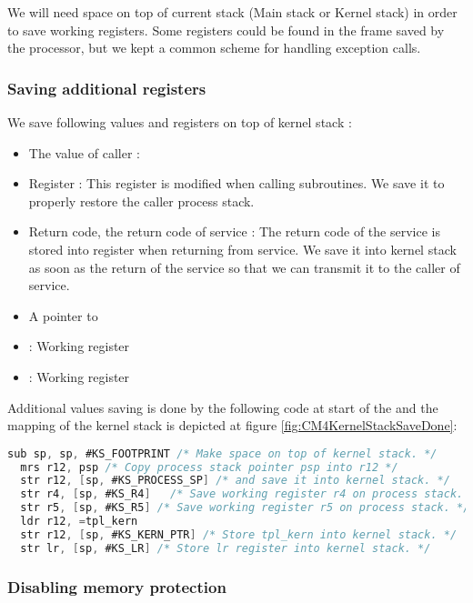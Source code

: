 We will need space on top of current stack (Main stack or Kernel stack)  in order to save working registers.
Some registers could be found in the frame saved by the processor, but we kept a common scheme for handling exception calls.

\subsubsection{Saving additional registers}

We save following values and registers on top of kernel stack :
\begin{itemize}
\item The value of caller  : 
\item Register  : This register is modified when calling subroutines. We save it to properly restore the caller process stack.
\item Return code, the return code of service : The return code of the service is stored into  register when returning from service. We save it into kernel stack as soon as the return of the service so that we can transmit it to the caller of service.
\item A pointer to 
\item {} : Working register
\item {} : Working register
\end{itemize}


Additional values saving is done by the following code at start of the  and the mapping of the kernel stack is depicted at figure \ref{fig:CM4KernelStackSaveDone}:

\begin{lstlisting}[language=C]
  sub sp, sp, #KS_FOOTPRINT /* Make space on top of kernel stack. */
  mrs r12, psp /* Copy process stack pointer psp into r12 */
  str r12, [sp, #KS_PROCESS_SP] /* and save it into kernel stack. */
  str r4, [sp, #KS_R4]	 /* Save working register r4 on process stack. */
  str r5, [sp, #KS_R5] /* Save working register r5 on process stack. */
  ldr r12, =tpl_kern
  str r12, [sp, #KS_KERN_PTR] /* Store tpl_kern into kernel stack. */
  str lr, [sp, #KS_LR] /* Store lr register into kernel stack. */
\end{lstlisting}

\subsubsection{Disabling memory protection}


